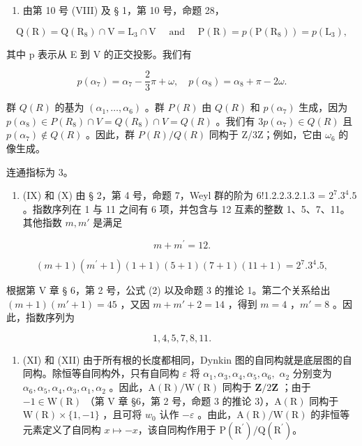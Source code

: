 \begin{enumerate}
\def\labelenumi{(\Roman{enumi})}
\setcounter{enumi}{7}
\tightlist
\item
  由第 10 号 (VIII) 及 § 1，第 10 号，命题 28，
\end{enumerate}

\[
\mathrm{Q} (\mathrm{R}) = \mathrm{Q} (\mathrm{R} _ {8}) \cap \mathrm{V} = \mathrm{L} _ {3} \cap \mathrm{V} \quad \text { and } \quad \mathrm{P} (\mathrm{R}) = p (\mathrm{P} (\mathrm{R} _ {8})) = p (\mathrm{L} _ {3}),
\]

其中 p 表示从 E 到 V 的正交投影。我们有

\[
p (\alpha_ {7}) = \alpha_ {7} - \frac {2}{3} \pi + \omega , \quad p (\alpha_ {8}) = \alpha_ {8} + \pi - 2 \omega .
\]

群 \(Q(R)\) 的基为 \((\alpha_{1},\ldots,\alpha_{6})\) 。群 \(P(R)\) 由 \(Q(R)\) 和 \(p(\alpha_{7})\) 生成，因为 \(p(\alpha_{8})\in P(R_{8})\cap V=Q(R_{8})\cap V=Q(R)\) 。我们有 \(3p(\alpha_{7})\in Q(R)\) 且 \(p(\alpha_{7})\notin Q(R)\) 。因此，群 \(P(R)/Q(R)\) 同构于 Z/3Z；例如，它由 \(\omega_{6}\) 的像生成。

连通指标为 3。

\begin{enumerate}
\def\labelenumi{(\Roman{enumi})}
\setcounter{enumi}{8}
\tightlist
\item
  (IX) 和 (X) 由 § 2，第 4 号，命题 7，Weyl 群的阶为 6!1.2.2.3.2.1.3 = \(2^{7}.3^{4}.5\) 。指数序列在 1 与 11 之间有 6 项，并包含与 12 互素的整数 1、5、7、11。其他指数 \(m, m'\) 是满足
\end{enumerate}

\[
m + m ^ {\prime} = 12.
\]

\[
(m + 1) \left(m ^ {\prime} + 1\right) (1 + 1) (5 + 1) (7 + 1) (11 + 1) = 2 ^ {7}. 3 ^ {4}. 5,
\]

根据第 V 章 § 6，第 2 号，公式 (2) 以及命题 3 的推论 1。第二个关系给出 \((m + 1)(m' + 1) = 45\) ，又因 \(m + m' + 2 = 14\) ，得到 \(m = 4\) ，\(m' = 8\) 。因此，指数序列为

\[
1, 4, 5, 7, 8, 11.
\]

\begin{enumerate}
\def\labelenumi{(\Roman{enumi})}
\setcounter{enumi}{10}
\tightlist
\item
  (XI) 和 (XII) 由于所有根的长度都相同，Dynkin 图的自同构就是底层图的自同构。除恒等自同构外，只有自同构 \(\varepsilon\) 将 \(\alpha_{1},\alpha_{3},\alpha_{4},\alpha_{5},\alpha_{6},\) \(\alpha_{2}\) 分别变为 \(\alpha_{6},\alpha_{5},\alpha_{4},\alpha_{3},\alpha_{1},\alpha_{2}\) 。因此，\(\mathrm{A(R) / W(R)}\) 同构于 \(\mathbf{Z} / 2\mathbf{Z}\) ；由于 \(-1\in \mathrm{W(R)}\) （第 V 章 §6，第 2 号，命题 3 的推论 3），\(\mathrm{A(R)}\) 同构于 \(\mathrm{W(R)}\times \{1, - 1\}\) ，且可将 \(w_0\) 认作 \(-\varepsilon\) 。由此，\(\mathrm{A(R) / W(R)}\) 的非恒等元素定义了自同构 \(x\mapsto -x\)，该自同构作用于 \(\mathrm{P(R^{\prime}) / Q(R^{\prime})}\)。
\end{enumerate}

